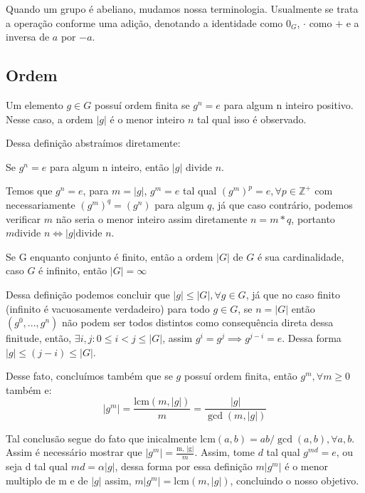 \documentclass[../main]{subfiles}
\begin{document}
Quando um grupo é abeliano, mudamos nossa terminologia. Usualmente se trata a
operação conforme uma adição, denotando a identidade como \(0_G\), \(\cdot\)
como \(+\) e a inversa de \(a\) por \(-a\).

\subsection*{Ordem}
\begin{definition}
    Um elemento \(g \in G\) possuí ordem finita se \(g^n = e\) para algum n
    inteiro positivo. Nesse caso, a ordem \(|g|\) é o menor inteiro \(n\) tal
    qual isso é observado.
\end{definition}

Dessa definição abstraímos diretamente:
\begin{lemma}
    Se \(g^n = e\) para algum n inteiro, então \(|g|\) divide \(n\). 
\end{lemma}
\begin{lemma}
  Temos que \(g^n = e\), para \(m = |g|\), \(g^m = e\) tal qual \((g^m)^p = e,
  \forall p \in \mathbb Z^+\) com necessariamente \((g^m)^q = (g^n)\) para algum
  \(q\), já que caso contrário, podemos verificar \(m\) não seria o menor
  inteiro assim diretamente \(n = m * q\), portanto \(m \text{divide } n \iff
  |g| \text{divide } n\). 
\end{lemma}

\begin{definition}
    Se G enquanto conjunto é finito, então a ordem \(|G|\) de \(G\) é sua
    cardinalidade, caso \(G\) é infinito, então \(|G| = \infty\)
\end{definition}

Dessa definição podemos concluir que \(|g| \leq |G|, \forall g \in G\), já que
no caso finito (infinito é vacuosamente verdadeiro) para todo \(g \in G\), se
\(n = |G|\) então \((g^0, ..., g^n)\) não podem ser todos distintos como
consequência direta dessa finitude, então, \(\exists i, j: 0 \leq i < j \leq
|G|\), assim \(g^i = g^j \implies g^{j - i} = e\). Dessa forma \(|g| \leq (j -
i) \leq |G|\). 

Desse fato, concluímos também que se \(g\) possuí ordem finita, então \(g^m,
\forall m \geq 0\) também e:
\[ |g^m| = \frac{\text{lcm}(m, |g|)}{m} = \frac{|g|}{\gcd(m, |g|)}\]

Tal conclusão segue do fato que inicalmente \(\text{lcm}(a, b) =
ab/\gcd(a, b), \forall a, b\). Assim é necessário mostrar que \(|g^m| =
\frac{\text{m, |g|}}{m}\). Assim, tome \(d\) tal qual \(g^{md} = e\), ou seja d
tal qual \(md = \alpha |g|\), dessa forma por essa definição \(m|g^m|\) é o
menor multiplo de m e de \(|g|\) assim, \(m|g^m| = \text{lcm}(m, |g|)\),
concluindo o nosso objetivo.
\end{document}
